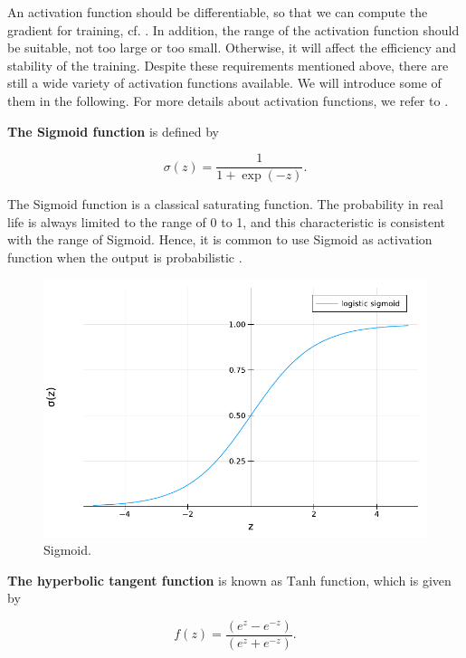 \documentclass[
	parskip, 			   %
	twoside, 			   %
	DIV=14, 			   %
	BCOR=15.0mm, 		   %
	headsepline, 		   %
	open=right, 		   %
	captions=tableheading, %
	bibliography=totoc,    %
	numbers=noenddot       %
]{scrreprt}
\begin{document}
An activation function should be differentiable, so that we can compute the gradient for training, cf. \cite{goodfellow2016deep}. In addition, the range of the activation function should be suitable, not too large or too small. Otherwise, it will affect the efficiency and stability of the training. Despite these requirements mentioned above, there are still a wide variety of activation functions available. We will introduce some of them in the following. For more details about activation functions, we refer to \cite{nwankpa2018activation}\cite{dubey2022activation}.

\textbf{The Sigmoid function} is defined by

\begin{equation}
    \label{eq:sigmoid}
    \sigma(z)=\frac{1}{1+\exp (-z)}.
\end{equation}

The Sigmoid function is a classical saturating function. The probability in real life is always limited to the range of 0 to 1, and this characteristic is consistent with the range of Sigmoid. Hence, it is common to use Sigmoid as activation function when the output is probabilistic \cite{nwankpa2018activation}. 

\begin{figure}[h!]
    \centering
    \includegraphics[scale=0.6]{figures/sigmoid.pdf}
    \caption{Sigmoid.}
    \label{fig:sigmoid}
\end{figure}

\textbf{The hyperbolic tangent function} is known as $\mathrm{Tanh}$ function, which is given by

\begin{equation}
    \label{eq:tanh}
    f(z)=\frac{\left(e^{z}-e^{-z}\right)}{\left(e^{z}+e^{-z}\right)}.
\end{equation}
\end{document}
